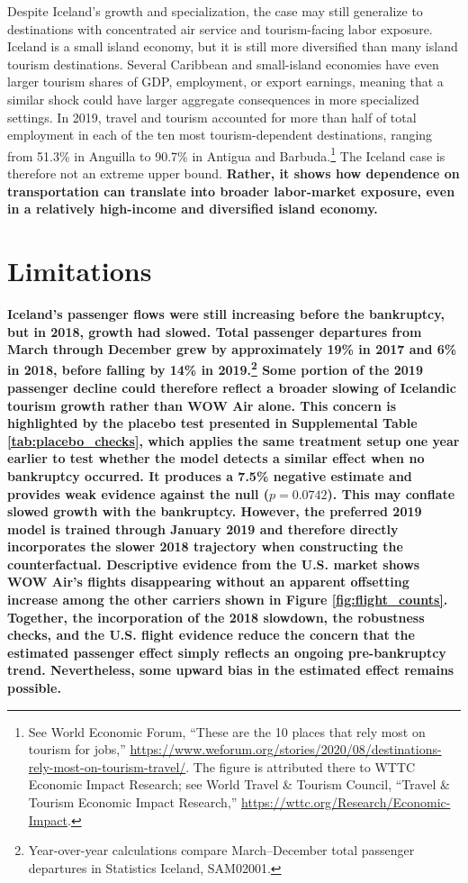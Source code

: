 \documentclass[12pt]{article}
\begin{document}
Despite Iceland's growth and specialization, the case may still generalize to destinations with concentrated air service and tourism-facing labor exposure. Iceland is a small island economy, but it is still more diversified than many island tourism destinations. Several Caribbean and small-island economies have even larger tourism shares of GDP, employment, or export earnings, meaning that a similar shock could have larger aggregate consequences in more specialized settings. In 2019, travel and tourism accounted for more than half of total employment in each of the ten most tourism-dependent destinations, ranging from 51.3\% in Anguilla to 90.7\% in Antigua and Barbuda.\footnote{See World Economic Forum, ``These are the 10 places that rely most on tourism for jobs,'' \url{https://www.weforum.org/stories/2020/08/destinations-rely-most-on-tourism-travel/}. The figure is attributed there to WTTC Economic Impact Research; see World Travel \& Tourism Council, ``Travel \& Tourism Economic Impact Research,'' \url{https://wttc.org/Research/Economic-Impact}.} The Iceland case is therefore not an extreme upper bound. \textbf{Rather, it shows how dependence on transportation can translate into broader labor-market exposure, even in a relatively high-income and diversified island economy.}




\clearpage
\section{Limitations}\label{sec:limitations}

\textbf{Iceland's passenger flows were still increasing before the bankruptcy, but in 2018, growth had slowed. Total passenger departures from March through December grew by approximately 19\% in 2017 and 6\% in 2018, before falling by 14\% in 2019.\footnote{Year-over-year calculations compare March--December total passenger departures in Statistics Iceland, SAM02001.} Some portion of the 2019 passenger decline could therefore reflect a broader slowing of Icelandic tourism growth rather than WOW Air alone. This concern is highlighted by the placebo test presented in Supplemental Table \ref{tab:placebo_checks}, which applies the same treatment setup one year earlier to test whether the model detects a similar effect when no bankruptcy occurred. It produces a 7.5\% negative estimate and provides weak evidence against the null ($p=0.0742$). This may conflate slowed growth with the bankruptcy. However, the preferred 2019 model is trained through January 2019 and therefore directly incorporates the slower 2018 trajectory when constructing the counterfactual. Descriptive evidence from the U.S. market shows WOW Air's flights disappearing without an apparent offsetting increase among the other carriers shown in Figure \ref{fig:flight_counts}. Together, the incorporation of the 2018 slowdown, the robustness checks, and the U.S. flight evidence reduce the concern that the estimated passenger effect simply reflects an ongoing pre-bankruptcy trend. Nevertheless, some upward bias in the estimated effect remains possible.}
\end{document}
